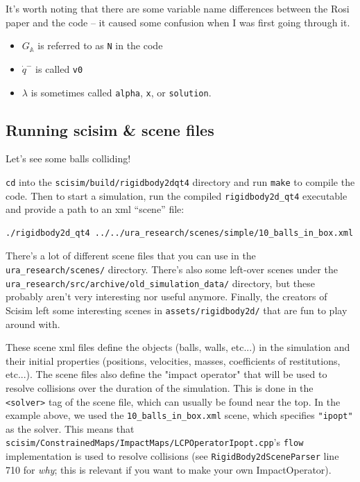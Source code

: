 \documentclass[12pt]{article}
\newcommand{\GA}{G_{\mathbb{A}}}
\begin{document}
It's worth noting that there are some variable name differences between the Rosi paper and the code
-- it caused some confusion when I was first going through it.
\begin{itemize}
    \item $\GA{}$ is referred to as \texttt{N} in the code
    \item $\dot{q}^-$ is called \texttt{v0}
    \item $\lambda$ is sometimes called \texttt{alpha}, \texttt{x}, or \texttt{solution}.
\end{itemize}

\subsection{Running scisim \& scene files}

Let's see some balls colliding!

\texttt{cd} into the \texttt{scisim/build/rigidbody2dqt4} directory and run \texttt{make} to compile the code.
Then to start a simulation, run the compiled \texttt{rigidbody2d\_qt4} executable and provide a path to an xml ``scene'' file:
\\\begin{verbatim}
./rigidbody2d_qt4 ../../ura_research/scenes/simple/10_balls_in_box.xml
\end{verbatim}

There's a lot of different scene files that you can use in the \texttt{ura\_research/scenes/} directory.
There's also some left-over scenes under the
\\\texttt{ura\_research/src/archive/old\_simulation\_data/} directory,
but these probably aren't very interesting nor useful anymore.
Finally, the creators of Scisim left some interesting scenes in \texttt{assets/rigidbody2d/} that are fun to play around with.

These scene xml files define the objects (balls, walls, etc...) in the simulation and their initial properties
(positions, velocities, masses, coefficients of restitutions, etc...).
The scene files also define the "impact operator" that will be used to resolve collisions over the duration of the simulation.
This is done in the \texttt{<solver>} tag of the scene file, which can usually be found near the top.
In the example above, we used the \texttt{10\_balls\_in\_box.xml} scene,
which specifies \texttt{"ipopt"} as the solver.
This means that
\\\texttt{scisim/ConstrainedMaps/ImpactMaps/LCPOperatorIpopt.cpp}'s \texttt{flow}
implementation is used to resolve collisions
(see \texttt{RigidBody2dSceneParser} line 710 for \textit{why};
this is relevant if you want to make your own ImpactOperator).
\end{document}
